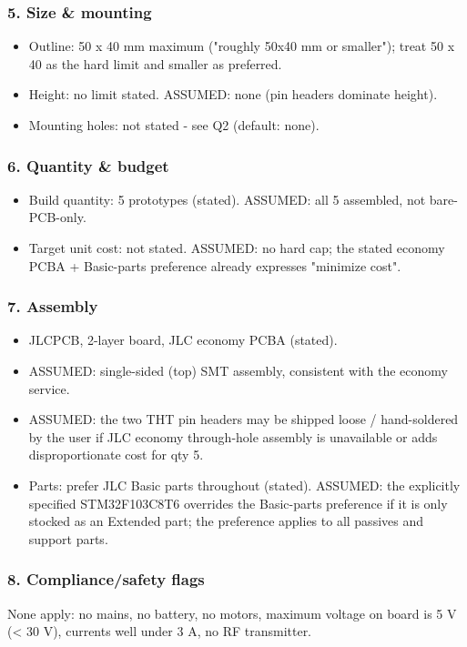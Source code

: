 \documentclass[11pt,a4paper]{article}
\begin{document}
\subsubsection*{5. Size \& mounting}
\begin{itemize}
\item Outline: 50 x 40 mm maximum ("roughly 50x40 mm or smaller"); treat 50 x 40
as the hard limit and smaller as preferred.
\item Height: no limit stated. ASSUMED: none (pin headers dominate height).
\item Mounting holes: not stated - see Q2 (default: none).
\end{itemize}
\subsubsection*{6. Quantity \& budget}
\begin{itemize}
\item Build quantity: 5 prototypes (stated). ASSUMED: all 5 assembled, not
bare-PCB-only.
\item Target unit cost: not stated. ASSUMED: no hard cap; the stated economy
PCBA + Basic-parts preference already expresses "minimize cost".
\end{itemize}
\subsubsection*{7. Assembly}
\begin{itemize}
\item JLCPCB, 2-layer board, JLC economy PCBA (stated).
\item ASSUMED: single-sided (top) SMT assembly, consistent with the economy
service.
\item ASSUMED: the two THT pin headers may be shipped loose / hand-soldered by
the user if JLC economy through-hole assembly is unavailable or adds
disproportionate cost for qty 5.
\item Parts: prefer JLC Basic parts throughout (stated). ASSUMED: the explicitly
specified STM32F103C8T6 overrides the Basic-parts preference if it is only
stocked as an Extended part; the preference applies to all passives and
support parts.
\end{itemize}
\subsubsection*{8. Compliance/safety flags}
None apply: no mains, no battery, no motors, maximum voltage on board is 5 V (\textless{} 30 V), currents well under 3 A, no RF transmitter.
\end{document}
